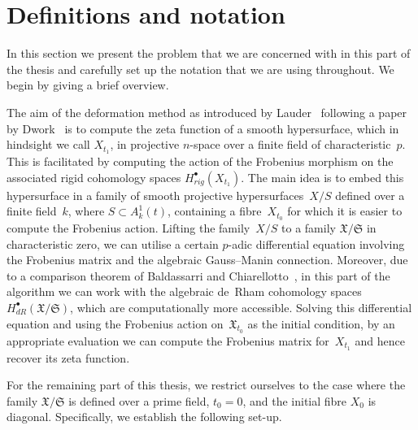

\section{Definitions and notation}

In this section we present the problem that we are concerned 
with in this part of the thesis and carefully set up the notation 
that we are using throughout.  We begin by giving a brief overview.

The aim of the deformation method as introduced by 
Lauder~\citep{Lau04} following a paper by Dwork~\citep{Dwork62b} 
is to compute the zeta function of a smooth 
hypersurface, which in hindsight we call $X_{t_1}$, in projective 
$n$-space over a finite field of characteristic~$p$.  This is 
facilitated by computing 
the action of the Frobenius morphism on the associated rigid cohomology 
spaces $H_{rig}^{\bullet}(X_{t_1})$.  The main idea is to embed this 
hypersurface in a family of smooth projective hypersurfaces~$X/S$ 
defined over a finite field~$k$, where $S \subset A_k^1(t)$, containing 
a fibre~$X_{t_0}$ for which it is easier to compute the Frobenius action. 
Lifting the family~$X/S$ to a family $\mathfrak{X}/\mathfrak{S}$ in 
characteristic zero, we can utilise a certain $p$-adic differential 
equation involving the Frobenius matrix and the algebraic Gauss--Manin 
connection.  Moreover, due to a comparison theorem of Baldassarri and 
Chiarellotto~\citep{BalChi94}, in this 
part of the algorithm we can work with the algebraic de~Rham cohomology 
spaces~$H_{dR}^{\bullet}(\mathfrak{X}/\mathfrak{S})$, which are 
computationally more accessible.  Solving this differential equation 
and using the Frobenius action on~$\mathfrak{X}_{t_0}$ as the initial 
condition, by an appropriate evaluation we can compute the Frobenius matrix 
for~$X_{t_1}$ and hence recover its zeta function.

For the remaining part of this thesis, we restrict ourselves to the 
case where the family $\mathfrak{X}/\mathfrak{S}$ is defined over a 
prime field, $t_0 = 0$, and the initial fibre $X_0$ is diagonal.  
Specifically, we establish the following set-up.

